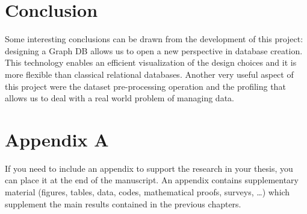 \documentclass{Configuration_Files/PoliMi3i_thesis}
\begin{document}
\chapter{Conclusion}
Some interesting conclusions can be drawn from the development of this project: designing a Graph DB allows us to open a new
perspective in database creation. This technology enables an efficient visualization of the design choices and it is more
flexible than classical relational databases. \newline
Another very useful aspect of this project were the dataset pre-processing operation and the profiling that allows us to deal
with a real world problem of managing data.


\cleardoublepage
{} %
\appendix
\chapter{Appendix A}
If you need to include an appendix to support the research in your thesis, you can place it at the end of the manuscript.
An appendix contains supplementary material (figures, tables, data, codes, mathematical proofs, surveys, \dots)
which supplement the main results contained in the previous chapters.


\listoffigures

\listoftables

\cleardoublepage
\end{document}
